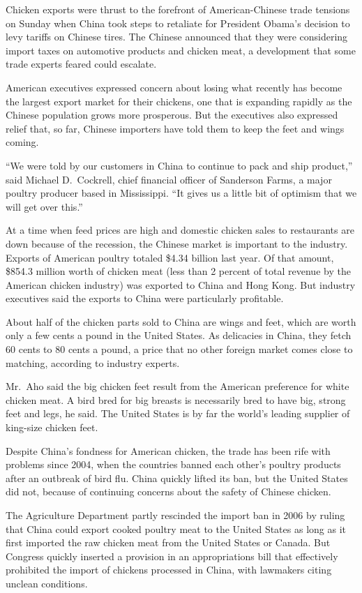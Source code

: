 ﻿\documentclass[12pt]{article}
\begin{document}
Chicken exports were thrust to the forefront of American-Chinese trade tensions on Sunday when China
took steps to retaliate for President Obama's decision to levy tariffs on Chinese tires. The Chinese
announced that they were considering import taxes on automotive products and chicken meat, a
development that some trade experts feared could escalate.

American executives expressed concern about losing what recently has become the largest export
market for their chickens, one that is expanding rapidly as the Chinese population grows more
prosperous. But the executives also expressed relief that, so far, Chinese importers have told them
to keep the feet and wings coming.

``We were told by our customers in China to continue to pack and ship product,'' said Michael
D.~Cockrell, chief financial officer of Sanderson Farms, a major poultry producer based in
Mississippi. ``It gives us a little bit of optimism that we will get over this.''

At a time when feed prices are high and domestic chicken sales to restaurants are down because of
the recession, the Chinese market is important to the industry. Exports of American poultry totaled
\$4.34 billion last year. Of that amount, \$854.3 million worth of chicken meat (less than 2 percent
of total revenue by the American chicken industry) was exported to China and Hong Kong. But industry
executives said the exports to China were particularly profitable.

About half of the chicken parts sold to China are wings and feet, which are worth only a few cents a
pound in the United States. As delicacies in China, they fetch 60 cents to 80 cents a pound, a price
that no other foreign market comes close to matching, according to industry experts.

Mr.~Aho said the big chicken feet result from the American preference for white chicken meat. A bird
bred for big breasts is necessarily bred to have big, strong feet and legs, he said. The United
States is by far the world's leading supplier of king-size chicken feet.

Despite China's fondness for American chicken, the trade has been rife with problems since 2004,
when the countries banned each other's poultry products after an outbreak of bird flu. China quickly
lifted its ban, but the United States did not, because of continuing concerns about the safety of
Chinese chicken.

The Agriculture Department partly rescinded the import ban in 2006 by ruling that China could export
cooked poultry meat to the United States as long as it first imported the raw chicken meat from the
United States or Canada. But Congress quickly inserted a provision in an appropriations bill that
effectively prohibited the import of chickens processed in China, with lawmakers citing unclean
conditions.
\end{document}
